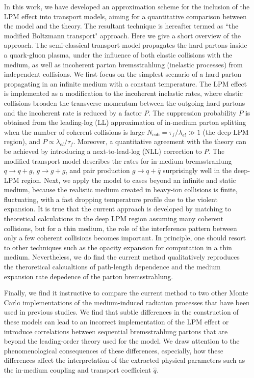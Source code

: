 \documentclass[aps, prc, reprint, amsmath, groupedaddress, nofootinbib]{revtex4-1}
\begin{document}
In this work, we have developed an approximation scheme for the inclusion of the LPM effect into transport models, aiming for a quantitative comparison between the model and the theory.
The resultant technique is hereafter termed as ``the modified Boltzmann transport" approach.
Here we give a short overview of the approach. 
The semi-classical transport model propagates the hard partons inside a quark-gluon plasma, under the influence of both elastic collisions with the medium, as well as incoherent parton bremsstrahlung (inelastic processes) from independent collisions.
We first focus on the simplest scenario of a hard parton propagating in an infinite medium with a constant temperature.
The LPM effect is implemented as a modification to the incoherent inelastic rates, where elastic collisions broaden the transverse momentum between the outgoing hard partons and the incoherent rate is reduced by a factor $P$.
The suppression probability $P$ is obtained from the leading-log (LL) approximation of in-medium parton splitting when the number of coherent collisions is large $N_{\textrm{coh}} = \tau_f/\lambda_{el} \gg 1$ (the deep-LPM region), and $P \propto \lambda_{el}/\tau_f$.
Moreover, a quantitative agreement with the theory can be achieved by introducing a next-to-lead-log (NLL) correction to $P$.
The modified transport model describes the rates for in-medium bremsstrahlung $q\rightarrow q+g$, $g\rightarrow g+g$, and pair production $g\rightarrow q+\bar{q}$ surprisingly well in the deep-LPM region.
Next, we apply the model to cases beyond an infinite and static medium, because the realistic medium created in heavy-ion collisions is finite, fluctuating, with a fast dropping temperature profile due to the violent expansion. 
It is true that the current approach is developed by matching to theoretical calculations in the deep LPM region assuming many coherent collisions, but for a thin medium, the role of the interference pattern between only a few coherent collisions becomes important.
In principle, one should resort to other techniques such as the opacity expansion \cite{Wiedemann:2000za,Gyulassy:1999zd} for computation in a thin medium. 
Nevertheless, we do find the current method qualitatively reproduces the theroretical calcualtions of path-length dependence \cite{CaronHuot:2010bp} and the medium expansion rate depedence \cite{Baier:1998yf} of the parton bremsstrahlung.

Finally, we find it instructive to compare the current method to two other Monte Carlo implementations of the medium-induced radiation processes that have been used in previous studies.
We find that subtle differences in the construction of these models can lead to an incorrect implementation of the LPM effect or introduce correlations between sequential bremsstrahlung partons that are beyond the leading-order theory used for the model.
We draw attention to the phenomenological consequences of these differences,
especially, how these differences affect the interpretation of the extracted physical parameters such as the in-medium coupling and transport coefficient $\hat{q}$.
\end{document}
